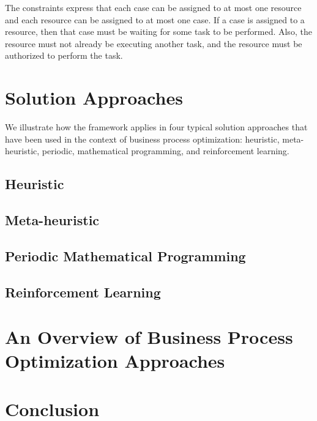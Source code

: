 \documentclass[runningheads]{llncs}
\begin{document}
The constraints express that each case can be assigned to at most one resource and each resource can be assigned to at most one case. If a case is assigned to a resource, then that case must be waiting for some task to be performed. Also, the resource must not already be executing another task, and the resource must be authorized to perform the task.

\section{Solution Approaches}\label{sec:solutionapproaches}

We illustrate how the framework applies in four typical solution approaches that have been used in the context of business process optimization: heuristic, meta-heuristic, periodic, mathematical programming, and reinforcement learning.


\subsection{Heuristic}
\subsection{Meta-heuristic}
\subsection{Periodic Mathematical Programming}
\subsection{Reinforcement Learning}


\section{An Overview of Business Process Optimization Approaches}\label{sec:survey}


\section{Conclusion}\label{sec:conclusion}



\end{document}
